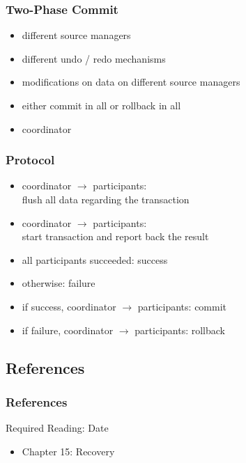 \documentclass[dvipsnames]{beamer}
\theoremstyle{plain}
\begin{document}
\begin{frame}
  \frametitle{Two-Phase Commit}

  \begin{itemize}
    \item different source managers
    \item different undo / redo mechanisms

    \medskip
    \item modifications on data on different source managers
    \item either commit in all or rollback in all

    \medskip
    \item coordinator
  \end{itemize}
\end{frame}

\begin{frame}
  \frametitle{Protocol}

  \begin{itemize}
    \item coordinator $\rightarrow$ participants:\\
      flush all data regarding the transaction

    \pause
    \item coordinator $\rightarrow$ participants:\\
      start transaction and report back the result

    \pause
    \medskip
    \item all participants succeeded: success
    \item otherwise: failure

    \medskip
    \item if success, coordinator $\rightarrow$ participants: commit
    \item if failure, coordinator $\rightarrow$ participants: rollback
  \end{itemize}
\end{frame}

\subsection*{References}

\begin{frame}
  \frametitle{References}

  \begin{block}{Required Reading: Date}
    \begin{itemize}
      \item Chapter 15: \alert{Recovery}
    \end{itemize}
  \end{block}
\end{frame}
\end{document}
